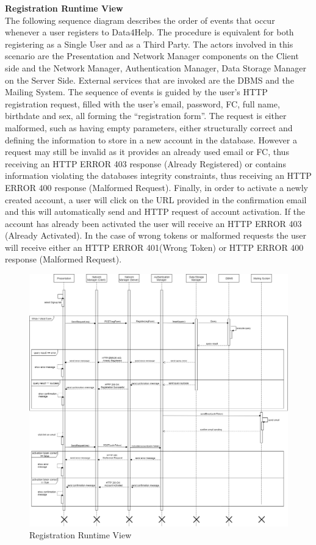 \documentclass[titlepage]{article}
\begin{document}
{\bf Registration Runtime View }\\ 
The following sequence diagram describes the order of events that occur whenever a user registers to Data4Help. The procedure is equivalent for both registering as a Single User and as a Third Party. The actors involved in this scenario are the Presentation and Network Manager components on the Client side and the Network Manager, Authentication Manager, Data Storage Manager on the Server Side. External services that are invoked are the DBMS and the Mailing System.
The sequence of events is guided by the user’s HTTP registration request, filled with the user’s email, password, FC, full name, birthdate and sex, all forming the “registration form”. The request is either malformed, such as having empty parameters, either structurally correct and defining the information to store in a new account in the database. However a request may still be invalid as it provides an already used email or FC, thus receiving an HTTP ERROR 403 response (Already Registered) or contains information violating the databases integrity constraints, thus receiving an HTTP ERROR 400 response (Malformed Request).
Finally, in order to activate a newly created account, a user will click on the URL provided in the confirmation email and this will automatically send and HTTP request of account activation. If the account has already been activated the user will receive an HTTP ERROR 403 (Already Activated). In the case of wrong tokens or malformed requests the user will receive either an HTTP ERROR 401(Wrong Token) or HTTP ERROR 400 response (Malformed Request).

\begin{figure}[H]
	\center
  	\includegraphics[width=15cm]{Registration.png}
  	\caption{Registration Runtime View}
 	\label{fig:REG}
\end{figure}
\end{document}
